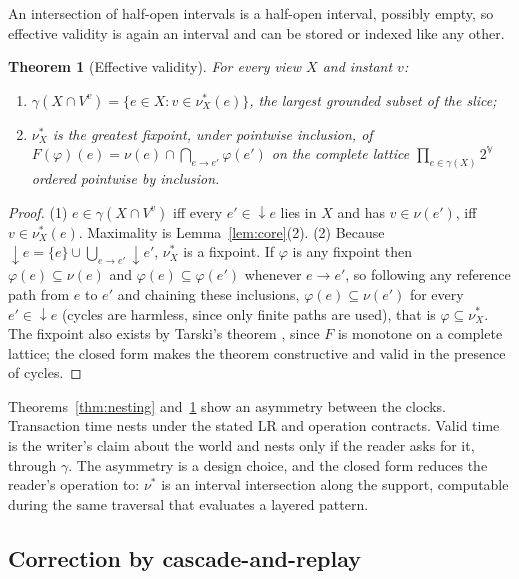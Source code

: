 \documentclass[11pt]{article}
\theoremstyle{plain}
\newtheorem{theorem}{Theorem}
\theoremstyle{definition}
\theoremstyle{remark}
\newcommand{\VT}{\mathbb{V}}             %
\newcommand{\refs}{\rightarrow}          %
\newcommand{\supp}{{\downarrow}}          %
\newcommand{\core}{\gamma}               %
\newcommand{\valid}{\nu}                 %
\newcommand{\eff}{\valid^{\ast}}
\begin{document}
An intersection of half-open intervals is a half-open interval, possibly empty,
so effective validity is again an interval and can be stored or indexed like any
other.

\begin{theorem}[Effective validity]\label{thm:effective}
For every view $X$ and instant $v$:
\begin{enumerate}
\item $\core(X\cap V^{v})=\{e\in X : v\in\eff_X(e)\}$, the largest grounded subset of the slice;
\item $\eff_X$ is the greatest fixpoint, under pointwise inclusion, of
$F(\varphi)(e)=\valid(e)\cap\bigcap_{e\refs e'}\varphi(e')$ on the complete
lattice $\prod_{e\in\core(X)}2^{\VT}$ ordered pointwise by inclusion.
\end{enumerate}
\end{theorem}

\begin{proof}
(1) $e\in\core(X\cap V^{v})$ iff every $e'\in\supp e$ lies in $X$ and has
$v\in\valid(e')$, iff $v\in\eff_X(e)$. Maximality is Lemma~\ref{lem:core}(2).
(2) Because $\supp e=\{e\}\cup\bigcup_{e\refs e'}\supp e'$, $\eff_X$ is a fixpoint. If
$\varphi$ is any fixpoint then $\varphi(e)\subseteq\valid(e)$ and
$\varphi(e)\subseteq\varphi(e')$ whenever $e\refs e'$, so following any reference path from $e$ to $e'$ and chaining these inclusions,
$\varphi(e)\subseteq\valid(e')$ for every $e'\in\supp e$ (cycles are harmless,
since only finite paths are used), that is
$\varphi\subseteq\eff_X$. The fixpoint also exists by Tarski's theorem
\cite{tarski1955lattice}, since $F$ is monotone on a complete lattice; the
closed form makes the theorem constructive and valid in the presence of cycles.
\end{proof}

Theorems~\ref{thm:nesting} and~\ref{thm:effective} show an asymmetry
between the clocks. Transaction time nests under the stated LR and operation contracts. Valid time is the writer's claim about the world and nests only
if the reader asks for it, through $\core$. The asymmetry is a design choice,
and the closed form reduces the reader's operation to: $\eff$ is an interval
intersection along the support, computable during the same traversal that
evaluates a layered pattern.

\subsection{Correction by cascade-and-replay}\label{sec:supersede}
\end{document}
